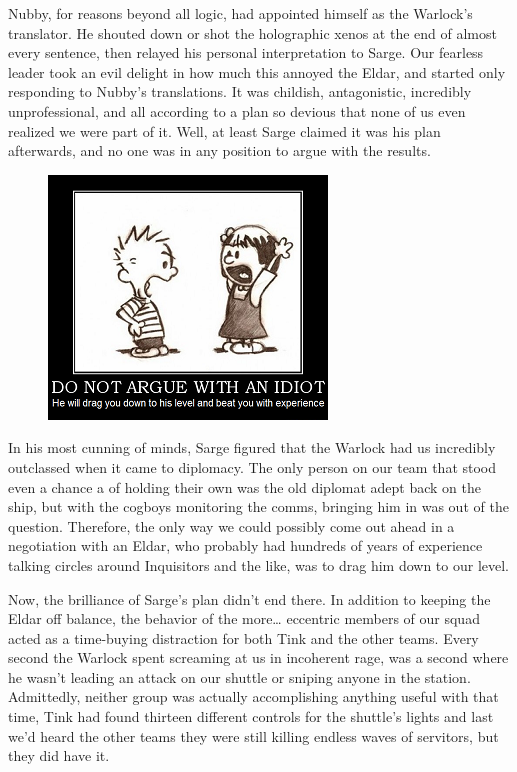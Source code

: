 Nubby, for reasons beyond all logic, had appointed himself as the Warlock's translator. 
He shouted down or shot the holographic xenos at the end of almost every sentence, then relayed his personal interpretation to Sarge. 
Our fearless leader took an evil delight in how much this annoyed the Eldar, and started only responding to Nubby's translations. 
It was childish, antagonistic, incredibly unprofessional, and all according to a plan so devious that none of us even realized we were part of it. 
Well, at least Sarge claimed it was his plan afterwards, and no one was in any position to argue with the results.

\begin{figure}
	\begin{center}
		\includegraphics[width=\figwidth]{pics/11/60.png}
	\end{center}
\end{figure}
In his most cunning of minds, Sarge figured that the Warlock had us incredibly outclassed when it came to diplomacy. 
The only person on our team that stood even a chance a of holding their own was the old diplomat adept back on the ship, but with the cogboys monitoring the comms, bringing him in was out of the question. 
Therefore, the only way we could possibly come out ahead in a negotiation with an Eldar, who probably had hundreds of years of experience talking circles around Inquisitors and the like, was to drag him down to our level. 


Now, the brilliance of Sarge's plan didn't end there. 
In addition to keeping the Eldar off balance, the behavior of the more… eccentric members of our squad acted as a time-buying distraction for both Tink and the other teams. 
Every second the Warlock spent screaming at us in incoherent rage, was a second where he wasn't leading an attack on our shuttle or sniping anyone in the station. 
Admittedly, neither group was actually accomplishing anything useful with that time, Tink had found thirteen different controls for the shuttle's lights and last we'd heard the other teams they were still killing endless waves of servitors, but they did have it.

